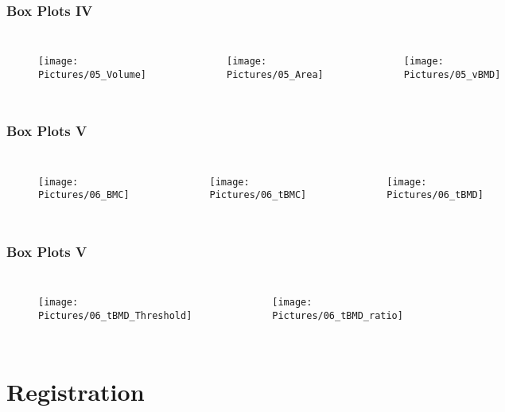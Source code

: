 \documentclass[xcolor=table]{beamer}
\begin{document}
\begin{frame}
	\frametitle{Box Plots IV}
	\begin{columns}
		\centering
		\begin{figure}
			\texttt{[image: Pictures/05\_Volume]}
		\end{figure}
		\centering
		\begin{figure}
			\texttt{[image: Pictures/05\_Area]}
		\end{figure}
		\centering
		\begin{figure}
			\texttt{[image: Pictures/05\_vBMD]}
		\end{figure}
	\end{columns}
\end{frame}

\begin{frame}
	\frametitle{Box Plots V}
	\begin{columns}
		\column[c]{0.3\linewidth}
		\centering
		\begin{figure}
			\texttt{[image: Pictures/06\_BMC]}
		\end{figure}
		\column[c]{0.3\linewidth}
		\centering
		\begin{figure}
			\texttt{[image: Pictures/06\_tBMC]}
		\end{figure}
		\column[c]{0.3\linewidth}
		\centering
		\begin{figure}
			\texttt{[image: Pictures/06\_tBMD]}
		\end{figure}
	\end{columns}
\end{frame}

\begin{frame}
	\frametitle{Box Plots V}
	\begin{columns}
		\centering
		\begin{figure}
			\texttt{[image: Pictures/06\_tBMD\_Threshold]}
		\end{figure}
		\centering
		\begin{figure}
			\texttt{[image: Pictures/06\_tBMD\_ratio]}
		\end{figure}
	\end{columns}
\end{frame}

\section{Registration}
\end{document}
